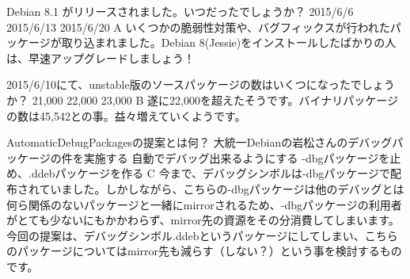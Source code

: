 %

\santaku
{Debian 8.1 がリリースされました。いつだったでしょうか？}
{2015/6/6}
{2015/6/13}
{2015/6/20}
{A}
{いくつかの脆弱性対策や、バグフィックスが行われたパッケージが取り込まれました。Debian 8(Jessie)をインストールしたばかりの人は、早速アップグレードしましょう！}

\santaku
{2015/6/10にて、unstable版のソースパッケージの数はいくつになったでしょうか？}
{21,000}
{22,000}
{23,000}
{B}
{遂に22,000を超えたそうです。バイナリパッケージの数は45,542との事。益々増えていくようです。}

\santaku
{AutomaticDebugPackagesの提案とは何？}
{大統一Debianの岩松さんのデバッグパッケージの件を実施する}
{自動でデバッグ出来るようにする}
{-dbgパッケージを止め、.ddebパッケージを作る}
{C}
{今まで、デバッグシンボルは-dbgパッケージで配布されていました。しかしながら、こちらの-dbgパッケージは他のデバッグとは何ら関係のないパッケージと一緒にmirrorされるため、-dbgパッケージの利用者がとても少ないにもかかわらず、mirror先の資源をその分消費してしまいます。今回の提案は、デバッグシンボル.ddebというパッケージにしてしまい、こちらのパッケージについてはmirror先も減らす（しない？）という事を検討するものです。}





